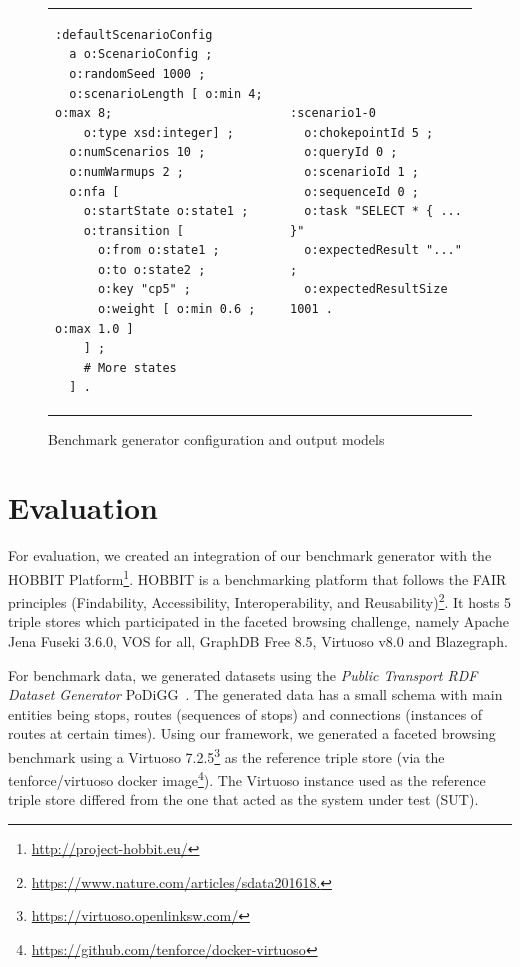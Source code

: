 \begin{figure}
\centering
\bgroup
\def\arraystretch{1.5}
\begin{tabular}{m{8cm}m{8cm}}
\begin{lstlisting}[language=sparql, linewidth=7cm]
:defaultScenarioConfig
  a o:ScenarioConfig ;
  o:randomSeed 1000 ;
  o:scenarioLength [ o:min 4; o:max 8;
    o:type xsd:integer] ;
  o:numScenarios 10 ;
  o:numWarmups 2 ;
  o:nfa [
    o:startState o:state1 ;
    o:transition [
      o:from o:state1 ;
      o:to o:state2 ;
      o:key "cp5" ;
      o:weight [ o:min 0.6 ; o:max 1.0 ]
    ] ;
    # More states
  ] .
\end{lstlisting}

&

\begin{lstlisting}[language=sparql, linewidth=7cm]
:scenario1-0
  o:chokepointId 5 ;
  o:queryId 0 ;
  o:scenarioId 1 ;
  o:sequenceId 0 ;
  o:task "SELECT * { ... }"
  o:expectedResult "..." ;
  o:expectedResultSize 1001 .
\end{lstlisting}

\\

\end{tabular}
\egroup
\caption{Benchmark generator configuration and output models}
\label{fig:config-and-output}
\end{figure}


\section{Evaluation}
\label{sec:evaluation}
For evaluation, we created an integration of our benchmark generator with the HOBBIT Platform\footnote{\url{http://project-hobbit.eu/}}.
HOBBIT is a benchmarking platform that follows the FAIR principles (Findability, Accessibility, Interoperability, and Reusability)\footnote{\url{https://www.nature.com/articles/sdata201618.}}.
It hosts 5 triple stores which participated in the faceted browsing challenge, namely
Apache Jena Fuseki 3.6.0, VOS for all, GraphDB Free 8.5, Virtuoso v8.0 and Blazegraph.

For benchmark data, we generated datasets using the \emph{Public Transport RDF Dataset Generator} PoDiGG~\cite{podigg}. The generated data has a small schema with main entities being stops, routes (sequences of stops) and connections (instances of routes at certain times). Using our framework, we generated a faceted browsing benchmark using a Virtuoso 7.2.5\footnote{\url{https://virtuoso.openlinksw.com/}} as the reference triple store (via the tenforce/virtuoso docker image\footnote{\url{https://github.com/tenforce/docker-virtuoso}}). The Virtuoso instance used as the reference triple store differed from the one that acted as the system under test (SUT).

